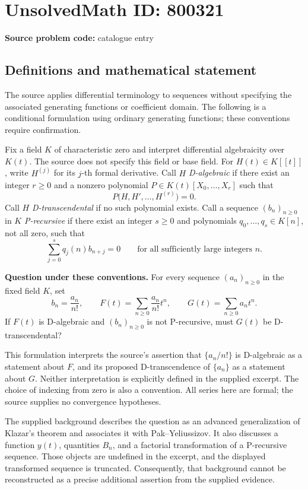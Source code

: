 \documentclass[11pt]{article}
\begin{document}
\section*{UnsolvedMath ID: 800321}
\textbf{Source problem code:} catalogue entry
\subsection{Definitions and mathematical statement}
The source applies differential terminology to sequences without specifying the associated generating functions or coefficient domain. The following is a conditional formulation using ordinary generating functions; these conventions require confirmation.

Fix a field \(K\) of characteristic zero and interpret differential algebraicity over \(K(t)\). The source does not specify this field or base field. For \(H(t)\in K[[t]]\), write \(H^{(j)}\) for its \(j\)-th formal derivative. Call \(H\) \emph{D-algebraic} if there exist an integer \(r\geq 0\) and a nonzero polynomial \(P\in K(t)[X_0,\ldots,X_r]\) such that
\[
P\bigl(H,H',\ldots,H^{(r)}\bigr)=0.
\]
Call \(H\) \emph{D-transcendental} if no such polynomial exists. Call a sequence \((b_n)_{n\geq 0}\) in \(K\) \emph{P-recursive} if there exist an integer \(s\geq 0\) and polynomials \(q_0,\ldots,q_s\in K[n]\), not all zero, such that
\[
\sum_{j=0}^{s}q_j(n)b_{n+j}=0
\qquad\text{for all sufficiently large integers }n.
\]

\textbf{Question under these conventions.} For every sequence \((a_n)_{n\geq 0}\) in the fixed field \(K\), set
\[
b_n=\frac{a_n}{n!},\qquad
F(t)=\sum_{n\geq 0}\frac{a_n}{n!}t^n,
\qquad
G(t)=\sum_{n\geq 0}a_nt^n.
\]
If \(F(t)\) is D-algebraic and \((b_n)_{n\geq 0}\) is not P-recursive, must \(G(t)\) be D-transcendental?

This formulation interprets the source's assertion that \(\{a_n/n!\}\) is D-algebraic as a statement about \(F\), and its proposed D-transcendence of \(\{a_n\}\) as a statement about \(G\). Neither interpretation is explicitly defined in the supplied excerpt. The choice of indexing from zero is also a convention. All series here are formal; the source supplies no convergence hypotheses.

The supplied background describes the question as an advanced generalization of Klazar's theorem and associates it with Pak--Yeliussizov. It also discusses a function \(y(t)\), quantities \(B_n\), and a factorial transformation of a P-recursive sequence. Those objects are undefined in the excerpt, and the displayed transformed sequence is truncated. Consequently, that background cannot be reconstructed as a precise additional assertion from the supplied evidence.
\end{document}
